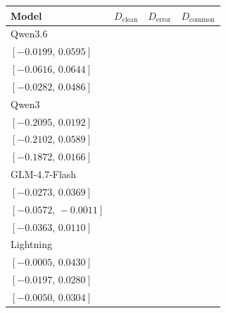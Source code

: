 \begingroup%
\fontsize{10}{11.5}\selectfont%
\setlength{\tabcolsep}{4pt}%
\renewcommand{\arraystretch}{1.08}%
\begin{tabular*}{\linewidth}{@{\extracolsep{\fill}}lccc@{}}
\toprule
Model & \(D_{\mathrm{clean}}\) & \(D_{\mathrm{error}}\) & \(D_{\mathrm{common}}\) \\
\midrule
Qwen3.6 & \begin{tabular}[t]{@{}c@{}}\(0.0198\)\\\([-0.0199,\,0.0595]\)\end{tabular} & \begin{tabular}[t]{@{}c@{}}\(0.0012\)\\\([-0.0616,\,0.0644]\)\end{tabular} & \begin{tabular}[t]{@{}c@{}}\(0.0105\)\\\([-0.0282,\,0.0486]\)\end{tabular}\\[2pt]
Qwen3 & \begin{tabular}[t]{@{}c@{}}\(-0.0954\)\\\([-0.2095,\,0.0192]\)\end{tabular} & \begin{tabular}[t]{@{}c@{}}\(-0.0738\)\\\([-0.2102,\,0.0589]\)\end{tabular} & \begin{tabular}[t]{@{}c@{}}\(-0.0846\)\\\([-0.1872,\,0.0166]\)\end{tabular}\\[2pt]
GLM-4.7-Flash & \begin{tabular}[t]{@{}c@{}}\(0.0041\)\\\([-0.0273,\,0.0369]\)\end{tabular} & \begin{tabular}[t]{@{}c@{}}\(-0.0292\)\\\([-0.0572,\,-0.0011]\)\end{tabular} & \begin{tabular}[t]{@{}c@{}}\(-0.0125\)\\\([-0.0363,\,0.0110]\)\end{tabular}\\[2pt]
Lightning & \begin{tabular}[t]{@{}c@{}}\(0.0213\)\\\([-0.0005,\,0.0430]\)\end{tabular} & \begin{tabular}[t]{@{}c@{}}\(0.0043\)\\\([-0.0197,\,0.0280]\)\end{tabular} & \begin{tabular}[t]{@{}c@{}}\(0.0128\)\\\([-0.0050,\,0.0304]\)\end{tabular}\\[2pt]

\end{tabular*}
